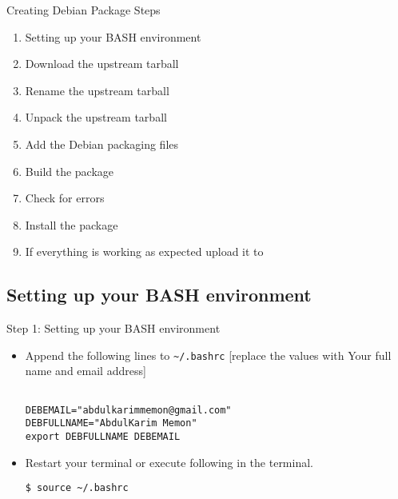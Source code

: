 \documentclass[red,10pt,a4paper]{beamer}
\begin{document}
\begin{frame}{Creating Debian Package Steps}
\begin{enumerate}
	\item Setting up your BASH environment
	\item Download the upstream tarball
	\item Rename the upstream tarball
	\item Unpack the upstream tarball
	\item Add the Debian packaging files
	\item Build the package
	\item Check for errors
	\item Install the package
	\item If everything is working as expected upload it to 
\end{enumerate}

\end{frame}

\subsection{Setting up your BASH environment}

\begin{frame}[fragile]{Step 1: Setting up your BASH environment}
\begin{itemize}
\item Append the following lines to \lstinline|~/.bashrc| \newline
\alert{[replace the values with Your full name and email address]}

\begin{lstlisting}

DEBEMAIL="abdulkarimmemon@gmail.com"
DEBFULLNAME="AbdulKarim Memon"
export DEBFULLNAME DEBEMAIL
    \end{lstlisting} 

\item Restart your terminal or execute following in the terminal.

\begin{lstlisting}
$ source ~/.bashrc
\end{lstlisting}

\end{itemize}
\end{frame}
\end{document}

